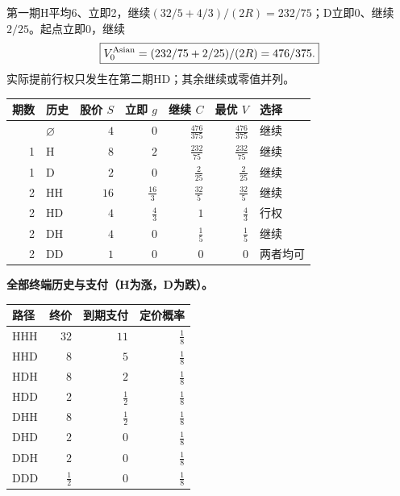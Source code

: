 \documentclass[11pt,a4paper,UTF8,fontset=fandol]{ctexart}
\begin{document}
第一期H平均6、立即2，继续\((32/5+4/3)/(2R)=232/75\)；D立即0、继续\(2/25\)。起点立即0，继续
\[\boxed{V_0^{\rm Asian}=(232/75+2/25)/(2R)=476/375.}\]
实际提前行权只发生在第二期HD；其余继续或零值并列。

\begingroup
\small
\setlength{\tabcolsep}{4pt}
\renewcommand{\arraystretch}{1.10}

\begin{longtable}[]{@{}rlrrrrl@{}}
\toprule\noalign{}
期数 & 历史 & 股价 \(S\) & 立即 \(g\) & 继续 \(C\) & 最优 \(V\) &
选择 \\
\midrule\noalign{}
\endhead
\bottomrule\noalign{}
\endlastfoot
0 & \(\varnothing\) & \(4\) & \(0\) & \(\frac{476}{375}\) &
\(\frac{476}{375}\) & 继续 \\
1 & H & \(8\) & \(2\) & \(\frac{232}{75}\) & \(\frac{232}{75}\) &
继续 \\
1 & D & \(2\) & \(0\) & \(\frac{2}{25}\) & \(\frac{2}{25}\) & 继续 \\
2 & HH & \(16\) & \(\frac{16}{3}\) & \(\frac{32}{5}\) & \(\frac{32}{5}\)
& 继续 \\
2 & HD & \(4\) & \(\frac{4}{3}\) & \(1\) & \(\frac{4}{3}\) & 行权 \\
2 & DH & \(4\) & \(0\) & \(\frac{1}{5}\) & \(\frac{1}{5}\) & 继续 \\
2 & DD & \(1\) & \(0\) & \(0\) & \(0\) & 两者均可 \\
\end{longtable}

\textbf{全部终端历史与支付（H为涨，D为跌）。}

\begin{longtable}[]{@{}lrrr@{}}
\toprule\noalign{}
路径 & 终价 & 到期支付 & 定价概率 \\
\midrule\noalign{}
\endhead
\bottomrule\noalign{}
\endlastfoot
HHH & \(32\) & \(11\) & \(\frac{1}{8}\) \\
HHD & \(8\) & \(5\) & \(\frac{1}{8}\) \\
HDH & \(8\) & \(2\) & \(\frac{1}{8}\) \\
HDD & \(2\) & \(\frac{1}{2}\) & \(\frac{1}{8}\) \\
DHH & \(8\) & \(\frac{1}{2}\) & \(\frac{1}{8}\) \\
DHD & \(2\) & \(0\) & \(\frac{1}{8}\) \\
DDH & \(2\) & \(0\) & \(\frac{1}{8}\) \\
DDD & \(\frac{1}{2}\) & \(0\) & \(\frac{1}{8}\) \\
\end{longtable}
\end{document}
